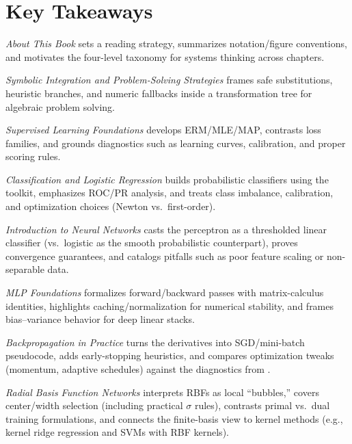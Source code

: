 \section*{Key Takeaways}
\begin{sloppypar}
{\raggedright
\begin{description}[leftmargin=3.6cm, labelwidth=3.2cm, labelsep=0.3cm, style=nextline]
\item[\Cref{chap:intro}] \textit{About This Book} sets a reading strategy, summarizes notation/figure conventions, and motivates the four-level taxonomy for systems thinking across chapters.
\item[\Cref{chap:symbolic}] \textit{Symbolic Integration and Problem-Solving Strategies} frames safe substitutions, heuristic branches, and numeric fallbacks inside a transformation tree for algebraic problem solving.
\item[\Cref{chap:supervised}] \textit{Supervised Learning Foundations} develops ERM/MLE/MAP, contrasts loss families, and grounds diagnostics such as learning curves, calibration, and proper scoring rules.
\item[\Cref{chap:logistic}] \textit{Classification and Logistic Regression} builds probabilistic classifiers using the  toolkit, emphasizes ROC/PR analysis, and treats class imbalance, calibration, and optimization choices (Newton vs.\ first-order).
\item[\Cref{chap:perceptron}] \textit{Introduction to Neural Networks} casts the perceptron as a thresholded linear classifier (vs.\ logistic as the smooth probabilistic counterpart), proves convergence guarantees, and catalogs pitfalls such as poor feature scaling or non-separable data.
\item[\Cref{chap:mlp}] \textit{MLP Foundations} formalizes forward/backward passes with matrix-calculus identities, highlights caching/normalization for numerical stability, and frames bias--variance behavior for deep linear stacks.
\item[\Cref{chap:backprop}] \textit{Backpropagation in Practice} turns the derivatives into SGD/mini\hyp{}batch pseudocode, adds early\hyp{}stopping heuristics, and compares optimization tweaks (momentum, adaptive schedules) against the diagnostics from .
\item[\Cref{chap:rbf}] \textit{Radial Basis Function Networks} interprets RBFs as local ``bubbles,'' covers center/width selection (including practical \(\sigma\) rules), contrasts primal vs.\ dual training formulations, and connects the finite-basis view to kernel methods (e.g., kernel ridge regression and SVMs with RBF kernels).

\end{description}}
\end{sloppypar}
